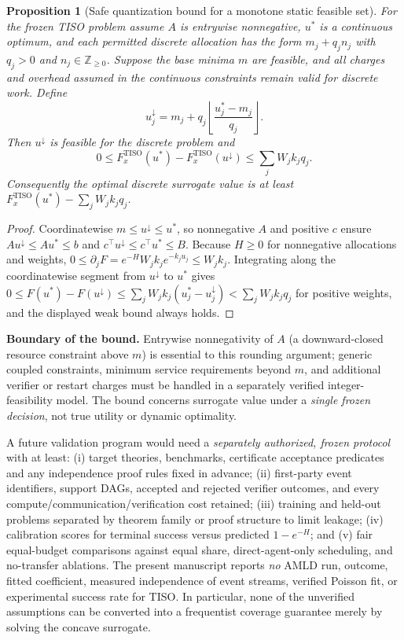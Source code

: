 \documentclass[11pt]{article}
\newtheorem{proposition}[definition]{Proposition}
\begin{document}
\begin{proposition}[Safe quantization bound for a monotone static feasible set]\label{prop:quantization}
For the frozen TISO problem assume $A$ is entrywise nonnegative, $u^*$ is a continuous optimum, and each permitted discrete allocation has the form $m_j+q_jn_j$ with $q_j>0$ and $n_j\in\mathbb Z_{\ge0}$. Suppose the base minima $m$ are feasible, and all charges and overhead assumed in the continuous constraints remain valid for discrete work. Define
\[
u_j^\downarrow=m_j+q_j\left\lfloor\frac{u_j^*-m_j}{q_j}\right\rfloor.
\]
Then $u^\downarrow$ is feasible for the discrete problem and
\begin{equation}\label{eq:quantization}
0\le F_x^{\mathrm{TISO}}(u^*)-F_x^{\mathrm{TISO}}(u^\downarrow)
\le\sum_j W_jk_jq_j.
\end{equation}
Consequently the optimal discrete surrogate value is at least $F_x^{\mathrm{TISO}}(u^*)-\sum_jW_jk_jq_j$.
\end{proposition}
\begin{proof}
Coordinatewise $m\le u^\downarrow\le u^*$, so nonnegative $A$ and positive $c$ ensure $Au^\downarrow\le Au^*\le b$ and $c^\top u^\downarrow\le c^\top u^*\le B$. Because $H\ge0$ for nonnegative allocations and weights,
$0\le\partial_j F=e^{-H}W_jk_je^{-k_ju_j}\le W_jk_j$.
Integrating along the coordinatewise segment from $u^\downarrow$ to $u^*$ gives
$0\le F(u^*)-F(u^\downarrow)\le\sum_j W_jk_j(u_j^*-u_j^\downarrow)<\sum_jW_jk_jq_j$ for positive weights, and the displayed weak bound always holds.
\end{proof}
\noindent\textbf{Boundary of the bound.} Entrywise nonnegativity of $A$ (a downward-closed resource constraint above $m$) is essential to this rounding argument; generic coupled constraints, minimum service requirements beyond $m$, and additional verifier or restart charges must be handled in a separately verified integer-feasibility model. The bound concerns surrogate value under a \emph{single frozen decision}, not true utility or dynamic optimality.

A future validation program would need a \emph{separately authorized, frozen protocol} with at least: (i) target theories, benchmarks, certificate acceptance predicates and any independence proof rules fixed in advance; (ii) first-party event identifiers, support DAGs, accepted and rejected verifier outcomes, and every compute/communication/verification cost retained; (iii) training and held-out problems separated by theorem family or proof structure to limit leakage; (iv) calibration scores for terminal success versus predicted $1-e^{-H}$; and (v) fair equal-budget comparisons against equal share, direct-agent-only scheduling, and no-transfer ablations. The present manuscript reports \emph{no} AMLD run, outcome, fitted coefficient, measured independence of event streams, verified Poisson fit, or experimental success rate for TISO. In particular, none of the unverified assumptions can be converted into a frequentist coverage guarantee merely by solving the concave surrogate.
\end{document}
